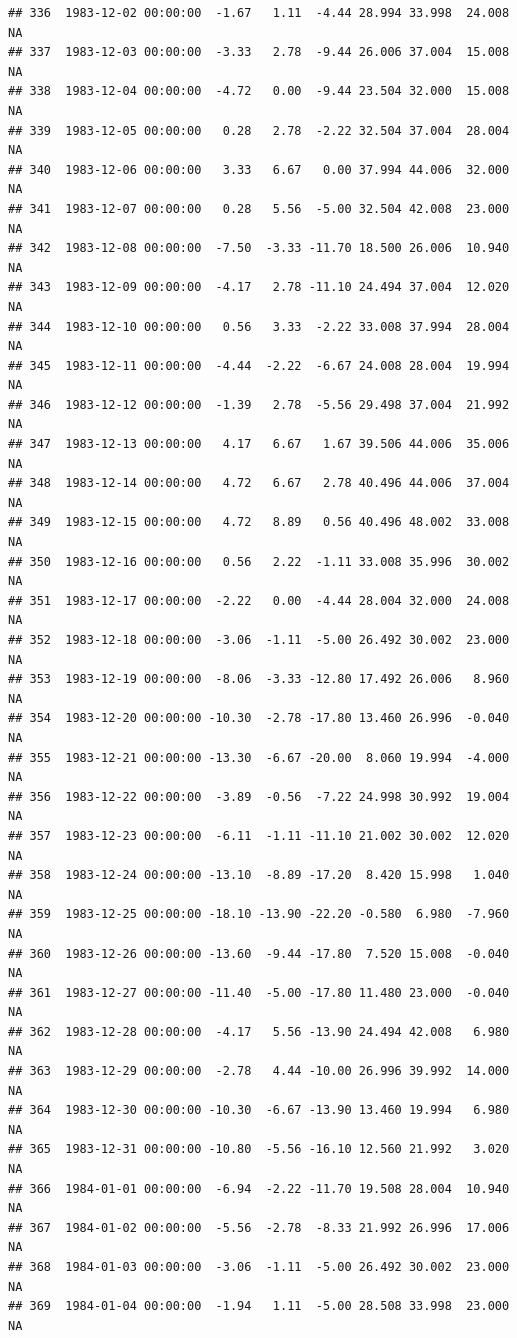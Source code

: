 \documentclass{article}\usepackage{graphicx, color}
\makeatletter
\newenvironment{kframe}{%
 \def\at@end@of@kframe{}%
 \ifinner\ifhmode%
  \def\at@end@of@kframe{\end{minipage}}%
  \begin{minipage}{\columnwidth}%
 \fi\fi%
 \def\FrameCommand##1{\hskip\@totalleftmargin \hskip-\fboxsep
 \colorbox{shadecolor}{##1}\hskip-\fboxsep
     \hskip-\linewidth \hskip-\@totalleftmargin \hskip\columnwidth}%
 \MakeFramed {\advance\hsize-\width
   \@totalleftmargin\z@ \linewidth\hsize
   \@setminipage}}%
 {\par\unskip\endMakeFramed%
 \at@end@of@kframe}
\newenvironment{knitrout}{}{} %
\makeatother
\begin{document}
\begin{knitrout}
\begin{kframe}
\begin{verbatim}
## 336  1983-12-02 00:00:00  -1.67   1.11  -4.44 28.994 33.998  24.008     NA
## 337  1983-12-03 00:00:00  -3.33   2.78  -9.44 26.006 37.004  15.008     NA
## 338  1983-12-04 00:00:00  -4.72   0.00  -9.44 23.504 32.000  15.008     NA
## 339  1983-12-05 00:00:00   0.28   2.78  -2.22 32.504 37.004  28.004     NA
## 340  1983-12-06 00:00:00   3.33   6.67   0.00 37.994 44.006  32.000     NA
## 341  1983-12-07 00:00:00   0.28   5.56  -5.00 32.504 42.008  23.000     NA
## 342  1983-12-08 00:00:00  -7.50  -3.33 -11.70 18.500 26.006  10.940     NA
## 343  1983-12-09 00:00:00  -4.17   2.78 -11.10 24.494 37.004  12.020     NA
## 344  1983-12-10 00:00:00   0.56   3.33  -2.22 33.008 37.994  28.004     NA
## 345  1983-12-11 00:00:00  -4.44  -2.22  -6.67 24.008 28.004  19.994     NA
## 346  1983-12-12 00:00:00  -1.39   2.78  -5.56 29.498 37.004  21.992     NA
## 347  1983-12-13 00:00:00   4.17   6.67   1.67 39.506 44.006  35.006     NA
## 348  1983-12-14 00:00:00   4.72   6.67   2.78 40.496 44.006  37.004     NA
## 349  1983-12-15 00:00:00   4.72   8.89   0.56 40.496 48.002  33.008     NA
## 350  1983-12-16 00:00:00   0.56   2.22  -1.11 33.008 35.996  30.002     NA
## 351  1983-12-17 00:00:00  -2.22   0.00  -4.44 28.004 32.000  24.008     NA
## 352  1983-12-18 00:00:00  -3.06  -1.11  -5.00 26.492 30.002  23.000     NA
## 353  1983-12-19 00:00:00  -8.06  -3.33 -12.80 17.492 26.006   8.960     NA
## 354  1983-12-20 00:00:00 -10.30  -2.78 -17.80 13.460 26.996  -0.040     NA
## 355  1983-12-21 00:00:00 -13.30  -6.67 -20.00  8.060 19.994  -4.000     NA
## 356  1983-12-22 00:00:00  -3.89  -0.56  -7.22 24.998 30.992  19.004     NA
## 357  1983-12-23 00:00:00  -6.11  -1.11 -11.10 21.002 30.002  12.020     NA
## 358  1983-12-24 00:00:00 -13.10  -8.89 -17.20  8.420 15.998   1.040     NA
## 359  1983-12-25 00:00:00 -18.10 -13.90 -22.20 -0.580  6.980  -7.960     NA
## 360  1983-12-26 00:00:00 -13.60  -9.44 -17.80  7.520 15.008  -0.040     NA
## 361  1983-12-27 00:00:00 -11.40  -5.00 -17.80 11.480 23.000  -0.040     NA
## 362  1983-12-28 00:00:00  -4.17   5.56 -13.90 24.494 42.008   6.980     NA
## 363  1983-12-29 00:00:00  -2.78   4.44 -10.00 26.996 39.992  14.000     NA
## 364  1983-12-30 00:00:00 -10.30  -6.67 -13.90 13.460 19.994   6.980     NA
## 365  1983-12-31 00:00:00 -10.80  -5.56 -16.10 12.560 21.992   3.020     NA
## 366  1984-01-01 00:00:00  -6.94  -2.22 -11.70 19.508 28.004  10.940     NA
## 367  1984-01-02 00:00:00  -5.56  -2.78  -8.33 21.992 26.996  17.006     NA
## 368  1984-01-03 00:00:00  -3.06  -1.11  -5.00 26.492 30.002  23.000     NA
## 369  1984-01-04 00:00:00  -1.94   1.11  -5.00 28.508 33.998  23.000     NA

\end{verbatim}
\end{kframe}
\end{knitrout}
\end{document}
